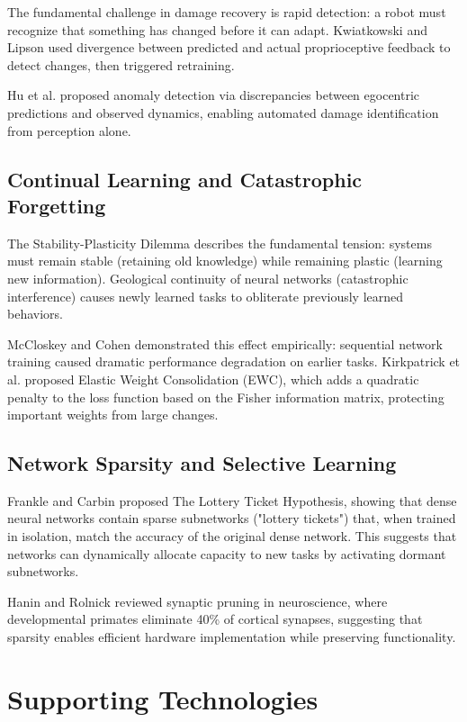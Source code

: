 \documentclass[journal]{IEEEtran}
\begin{document}
The fundamental challenge in damage recovery is rapid detection: a robot must recognize that something has changed before it can adapt. Kwiatkowski and Lipson \cite{kwiatkowski2019} used divergence between predicted and actual proprioceptive feedback to detect changes, then triggered retraining.

Hu et al. \cite{hu2024b} proposed anomaly detection via discrepancies between egocentric predictions and observed dynamics, enabling automated damage identification from perception alone.

\subsection{Continual Learning and Catastrophic Forgetting}

The Stability-Plasticity Dilemma \cite{mermillod2013} describes the fundamental tension: systems must remain stable (retaining old knowledge) while remaining plastic (learning new information). Geological continuity of neural networks (catastrophic interference) causes newly learned tasks to obliterate previously learned behaviors.

McCloskey and Cohen \cite{catastrophic1989} demonstrated this effect empirically: sequential network training caused dramatic performance degradation on earlier tasks. Kirkpatrick et al. \cite{elastic2017} proposed Elastic Weight Consolidation (EWC), which adds a quadratic penalty to the loss function based on the Fisher information matrix, protecting important weights from large changes.

\subsection{Network Sparsity and Selective Learning}

Frankle and Carbin \cite{lottery2019} proposed The Lottery Ticket Hypothesis, showing that dense neural networks contain sparse subnetworks ("lottery tickets") that, when trained in isolation, match the accuracy of the original dense network. This suggests that networks can dynamically allocate capacity to new tasks by activating dormant subnetworks.

Hanin and Rolnick \cite{synapticpruning2016} reviewed synaptic pruning in neuroscience, where developmental primates eliminate 40\% of cortical synapses, suggesting that sparsity enables efficient hardware implementation while preserving functionality.

\section{Supporting Technologies}
\end{document}
